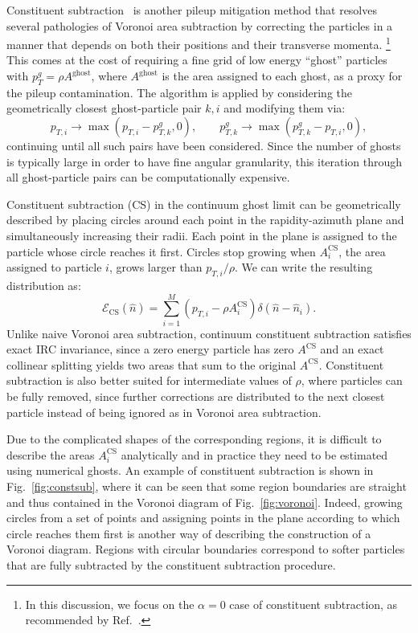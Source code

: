 \documentclass[letterpaper,11pt]{article}
\newcommand{\E}{\mathcal{E}}
\DeclareRobustCommand{\Fig}[1]{Fig.~\ref{#1}}
\DeclareRobustCommand{\Ref}[1]{Ref.~\cite{#1}}
\begin{document}
Constituent subtraction~\cite{Berta:2014eza} is another pileup mitigation method that resolves several pathologies of Voronoi area subtraction by correcting the particles in a manner that depends on both their positions and their transverse momenta.%
%
\footnote{In this discussion, we focus on the $\alpha=0$ case of constituent subtraction, as recommended by \Ref{Berta:2014eza}.}
%
This comes at the cost of requiring a fine grid of low energy ``ghost'' particles with $p_T^g=\rho A^\text{ghost}$, where $A^\text{ghost}$ is the area assigned to each ghost, as a proxy for the pileup contamination.
%
The algorithm is applied by considering the geometrically closest ghost-particle pair $k,i$ and modifying them via:
%
\begin{equation}
p_{T,i} \to \max(p_{T,i} - p_{T,k}^g, 0), \quad \quad p_{T,k}^g \to \max(p_{T,k}^g - p_{T,i}, 0),
\end{equation}
%
continuing until all such pairs have been considered.
%
Since the number of ghosts is typically large in order to have fine angular granularity, this iteration through all ghost-particle pairs can be computationally expensive.


Constituent subtraction (CS) in the continuum ghost limit can be geometrically described by placing circles around each point in the rapidity-azimuth plane and simultaneously increasing their radii.
%
Each point in the plane is assigned to the particle whose circle reaches it first.
%
Circles stop growing when $A_i^\text{CS}$, the area assigned to particle $i$, grows larger than $p_{T,i}/\rho$.
%
We can write the resulting distribution as:
%
\begin{equation}
\label{eq:ecs}
\E_\text{CS}(\hat n)=\sum_{i=1}^M\left(p_{T,i}-\rho A_i^\text{CS}\right)\delta(\hat n-\hat n_i).
\end{equation}
%
Unlike naive Voronoi area subtraction, continuum constituent subtraction satisfies exact IRC invariance, since a zero energy particle has zero $A^\text{CS}$ and an exact collinear splitting yields two areas that sum to the original $A^\text{CS}$.
%
Constituent subtraction is also better suited for intermediate values of $\rho$, where particles can be fully removed, since further corrections are distributed to the next closest particle instead of being ignored as in Voronoi area subtraction.


Due to the complicated shapes of the corresponding regions, it is difficult to describe the areas $A_i^\text{CS}$ analytically and in practice they need to be estimated using numerical ghosts.
%
An example of constituent subtraction is shown in \Fig{fig:constsub}, where it can be seen that some region boundaries are straight and thus contained in the Voronoi diagram of \Fig{fig:voronoi}.
%
Indeed, growing circles from a set of points and assigning points in the plane according to which circle reaches them first is another way of describing the construction of a Voronoi diagram.
%
Regions with circular boundaries correspond to softer particles that are fully subtracted by the constituent subtraction procedure.
\end{document}
